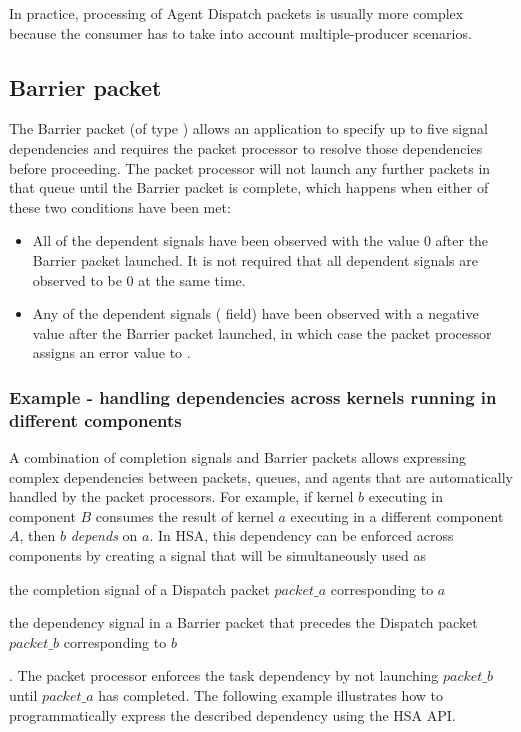 \documentclass[final]{book}
\begin{document}
In practice, processing of Agent Dispatch packets is usually more
complex because the consumer has to take into account multiple-producer
scenarios.

\subsection{Barrier packet}\label{barrier-packet}

The Barrier packet (of type ) allows an application
to specify up to five signal dependencies and requires the packet processor to
resolve those dependencies before proceeding.  The packet processor will not
launch any further packets in that queue until the Barrier packet is complete,
which happens when either of these two conditions have been met:
\begin{itemize}[itemsep=1pt,topsep=3pt,partopsep=0pt]
\item All of the dependent signals have been observed with the value 0 after the
  Barrier packet launched. It is not required that all dependent signals are
  observed to be 0 at the same time.
\item Any of the dependent signals (
  field) have been observed with a negative value after the Barrier packet
  launched, in which case the packet processor assigns an error value to
  .
\end{itemize}

\subsubsection{Example - handling dependencies across kernels running in
  different components}
A combination of completion signals and Barrier packets allows expressing
complex dependencies between packets, queues, and agents that are automatically
handled by the packet processors. For example, if kernel $b$ executing in
component $B$ consumes the result of kernel $a$ executing in a different
component $A$, then $b$ \textit{depends} on $a$. In HSA, this dependency can be
enforced across components by creating a signal that will be simultaneously used
as \begin{inparaenum}[I\upshape)] \item the completion signal of a Dispatch
  packet $packet\_a$ corresponding to $a$ \item the dependency signal in a
  Barrier packet that precedes the Dispatch packet $packet\_b$ corresponding to
  $b$\end{inparaenum}. The packet processor enforces the task dependency by not
launching $packet\_b$ until $packet\_a$ has completed. The following example
illustrates how to programmatically express the described dependency using the
HSA API.

\end{document}
